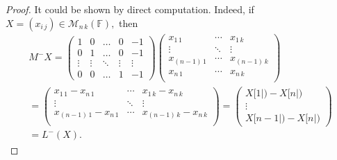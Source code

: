 \documentclass[10pt,a4paper]{amsart}
\def\F{{\mathbb F}}
\def\M{{\mathcal M}}
\begin{document}
\begin{proof}It could be shown by direct computation. Indeed, if $X = (x_{i\,j}) \in \M_{n\,k}(\F),$ then
\begin{multline*}
M^{-}X = \begin{pmatrix}
1 & 0 & \ldots & 0 & -1\\
0 & 1 & \ldots & 0 & -1\\
\vdots & \vdots & \ddots & \vdots & \vdots\\
0 & 0 & \ldots & 1 & -1
\end{pmatrix}
\begin{pmatrix}
x_{1\,1} & \cdots & x_{1\,k}\\
\vdots & \ddots & \vdots\\
x_{(n-1)\,1} & \cdots & x_{(n-1)\,k}\\
x_{n\,1} & \cdots & x_{n\,k}\\
\end{pmatrix}\\ = \begin{pmatrix}
x_{1\,1} - x_{n\,1} & \cdots & x_{1\,k} - x_{n\,k}\\
\vdots & \ddots & \vdots\\
x_{(n-1)\,1} - x_{n\,1} & \cdots & x_{(n-1)\,k} - x_{n\,k}\\
\end{pmatrix} = \begin{pmatrix}X[1|) - X[n|)\\ \vdots \\X[n-1|) - X[n|)\end{pmatrix}\\
 = L^{-}(X).
\end{multline*}
\end{proof}
\end{document}
